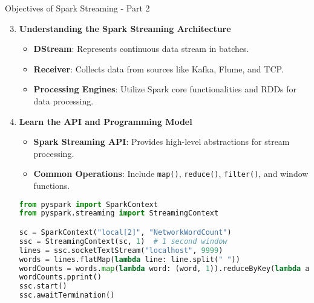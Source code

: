 \documentclass[aspectratio=169]{beamer}
\begin{document}
\begin{frame}[fragile]{Objectives of Spark Streaming - Part 2}
    \begin{enumerate}
        \setcounter{enumi}{2}
        \item \textbf{Understanding the Spark Streaming Architecture}
        \begin{itemize}
            \item \textbf{DStream}: Represents continuous data stream in batches.
            \item \textbf{Receiver}: Collects data from sources like Kafka, Flume, and TCP.
            \item \textbf{Processing Engines}: Utilize Spark core functionalities and RDDs for data processing.
        \end{itemize}
        
        \item \textbf{Learn the API and Programming Model}
        \begin{itemize}
            \item \textbf{Spark Streaming API}: Provides high-level abstractions for stream processing.
            \item \textbf{Common Operations}: Include \texttt{map()}, \texttt{reduce()}, \texttt{filter()}, and window functions.
        \end{itemize}
        
        \begin{lstlisting}[language=Python, title=Python Code Snippet]
from pyspark import SparkContext
from pyspark.streaming import StreamingContext

sc = SparkContext("local[2]", "NetworkWordCount")
ssc = StreamingContext(sc, 1)  # 1 second window
lines = ssc.socketTextStream("localhost", 9999)
words = lines.flatMap(lambda line: line.split(" "))
wordCounts = words.map(lambda word: (word, 1)).reduceByKey(lambda a, b: a + b)
wordCounts.pprint()
ssc.start()
ssc.awaitTermination()
        \end{lstlisting}
    \end{enumerate}
\end{frame}
\end{document}
